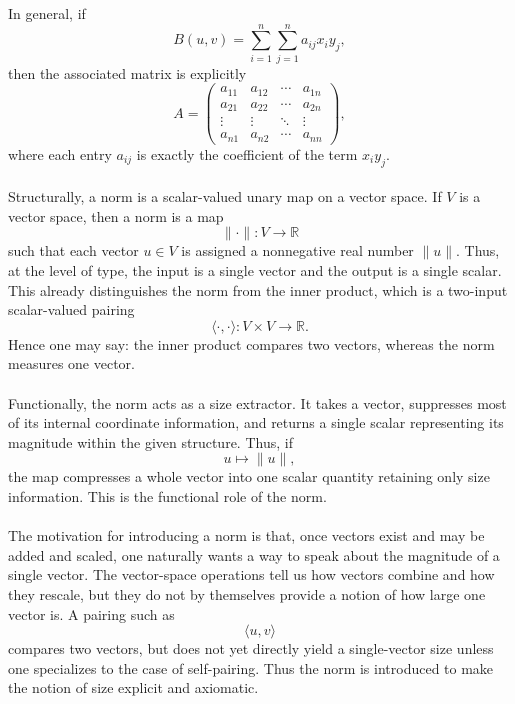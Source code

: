 \documentclass{article}
\begin{document}
	In general, if
	$$
	B(u,v)=\sum_{i=1}^n\sum_{j=1}^n a_{ij}x_i y_j,
	$$
	then the associated matrix is explicitly
	$$
	A=
	\begin{pmatrix}
		a_{11} & a_{12} & \cdots & a_{1n}\\
		a_{21} & a_{22} & \cdots & a_{2n}\\
		\vdots & \vdots & \ddots & \vdots\\
		a_{n1} & a_{n2} & \cdots & a_{nn}
	\end{pmatrix},
	$$
	where each entry $a_{ij}$ is exactly the coefficient of the term $x_i y_j$.
	
	\paragraph{}
	Structurally, a norm is a scalar-valued unary map on a vector space. If $V$ is a vector space, then a norm is a map
	$$
	\|\cdot\|:V\to\mathbb{R}
	$$
	such that each vector $u\in V$ is assigned a nonnegative real number $\|u\|$. Thus, at the level of type, the input is a single vector and the output is a single scalar. This already distinguishes the norm from the inner product, which is a two-input scalar-valued pairing
	$$
	\langle\cdot,\cdot\rangle:V\times V\to\mathbb{R}.
	$$
	Hence one may say: the inner product compares two vectors, whereas the norm measures one vector.
	
	\paragraph{}
	Functionally, the norm acts as a size extractor. It takes a vector, suppresses most of its internal coordinate information, and returns a single scalar representing its magnitude within the given structure. Thus, if
	$$
	u\mapsto \|u\|,
	$$
	the map compresses a whole vector into one scalar quantity retaining only size information. This is the functional role of the norm.
	
	\paragraph{}
	The motivation for introducing a norm is that, once vectors exist and may be added and scaled, one naturally wants a way to speak about the magnitude of a single vector. The vector-space operations tell us how vectors combine and how they rescale, but they do not by themselves provide a notion of how large one vector is. A pairing such as
	$$
	\langle u,v\rangle
	$$
	compares two vectors, but does not yet directly yield a single-vector size unless one specializes to the case of self-pairing. Thus the norm is introduced to make the notion of size explicit and axiomatic.
	
\end{document}
